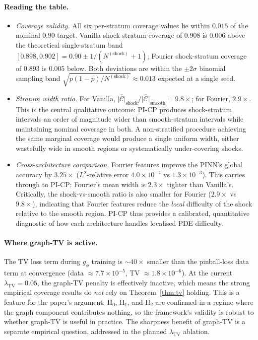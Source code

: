 \documentclass[11pt]{article}
\theoremstyle{definition}
\theoremstyle{remark}
\newcommand{\TV}{\mathrm{TV}}
\begin{document}
\paragraph{Reading the table.}
\begin{itemize}[leftmargin=*,topsep=2pt,itemsep=2pt]
\item \emph{Coverage validity.} All six per-stratum coverage values lie within $0.015$ of the nominal $0.90$ target. Vanilla shock-stratum coverage of $0.908$ is $0.006$ above the theoretical single-stratum band $[0.898, 0.902] = 0.90 \pm 1/(N^{(\text{shock})}+1)$; Fourier shock-stratum coverage of $0.893$ is $0.005$ below. Both deviations are within the $\pm 2\sigma$ binomial sampling band $\sqrt{p(1-p)/N^{(\text{shock})}} \approx 0.013$ expected at a single seed.

\item \emph{Stratum width ratio.} For Vanilla, $\overline{|\mathcal{C}|}_{\text{shock}} / \overline{|\mathcal{C}|}_{\text{smooth}} = 9.8\times$; for Fourier, $2.9\times$. This is the central qualitative outcome: PI-CP produces shock-stratum intervals an order of magnitude wider than smooth-stratum intervals while maintaining nominal coverage in both. A non-stratified procedure achieving the same marginal coverage would produce a single uniform width, either wastefully wide in smooth regions or systematically under-covering shocks.

\item \emph{Cross-architecture comparison.} Fourier features improve the PINN's global accuracy by $3.25\times$ ($L^2$-relative error $4.0\!\times\!10^{-4}$ vs $1.3\!\times\!10^{-3}$). This carries through to PI-CP: Fourier's mean width is $2.3\times$ tighter than Vanilla's. Critically, the shock-vs-smooth ratio is also smaller for Fourier ($2.9\times$ vs $9.8\times$), indicating that Fourier features reduce the \emph{local} difficulty of the shock relative to the smooth region. PI-CP thus provides a calibrated, quantitative diagnostic of how each architecture handles localised PDE difficulty.
\end{itemize}

\paragraph{Where graph-TV is active.} The TV loss term during $g_\phi$ training is $\sim 40\times$ smaller than the pinball-loss data term at convergence (data $\approx 7.7 \times 10^{-5}$, TV $\approx 1.8 \times 10^{-6}$). At the current $\lambda_{\TV} = 0.05$, the graph-TV penalty is effectively inactive, which means the strong empirical coverage results do \emph{not} rely on Theorem~\ref{thm:tv} holding. This is a feature for the paper's argument: H$_0$, H$_1$, and H$_2$ are confirmed in a regime where the graph component contributes nothing, so the framework's validity is robust to whether graph-TV is useful in practice. The sharpness benefit of graph-TV is a separate empirical question, addressed in the planned $\lambda_{\TV}$ ablation.
\end{document}
